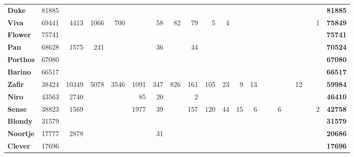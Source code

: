 \begin{table}[p]
{\begin{tabular}{lrrrrrrrrrrrrrrrrrrrr}
\textbf{Duke} & 81885 &       &       &       &       &       &       &       &       &       &       &       &       &       &       &       &       &       &       & \textbf{81885} \\
\textbf{Viva} & 69441 & 4413  & 1066  & 700   &       & 58    & 82    & 79    & 5     & 4     &       &       &       &       &       &       &       &       & 1     & \textbf{75849} \\
\textbf{Flower} & 75741 &       &       &       &       &       &       &       &       &       &       &       &       &       &       &       &       &       &       & \textbf{75741} \\
\textbf{Pan} & 68628 & 1575  & 241   &       &       & 36    &       & 44    &       &       &       &       &       &       &       &       &       &       &       & \textbf{70524} \\
\textbf{Porthos} & 67080 &       &       &       &       &       &       &       &       &       &       &       &       &       &       &       &       &       &       & \textbf{67080} \\
\textbf{Barino} & 66517 &       &       &       &       &       &       &       &       &       &       &       &       &       &       &       &       &       &       & \textbf{66517} \\
\textbf{Zafir} & 38424 & 10349 & 5078  & 3546  & 1091  & 347   & 826   & 161   & 105   & 23    & 9     & 13    &       &       &       &       & 12    &       &       & \textbf{59984} \\
\textbf{Niro} & 43563 & 2740  &       &       & 85    & 20    &       & 2     &       &       &       &       &       &       &       &       &       &       &       & \textbf{46410} \\
\textbf{Sense} & 38823 & 1569  &       &       & 1977  & 39    &       & 157   & 120   & 44    & 15    & 6     &       &       & 6     &       &       &       & 2     & \textbf{42758} \\
\textbf{Blondy} & 31579 &       &       &       &       &       &       &       &       &       &       &       &       &       &       &       &       &       &       & \textbf{31579} \\
\textbf{Noortje} & 17777 & 2878  &       &       &       & 31    &       &       &       &       &       &       &       &       &       &       &       &       &       & \textbf{20686} \\
\textbf{Clever} & 17696 &       &       &       &       &       &       &       &       &       &       &       &       &       &       &       &       &       &       & \textbf{17696} \\

\end{tabular}}
\end{table}

